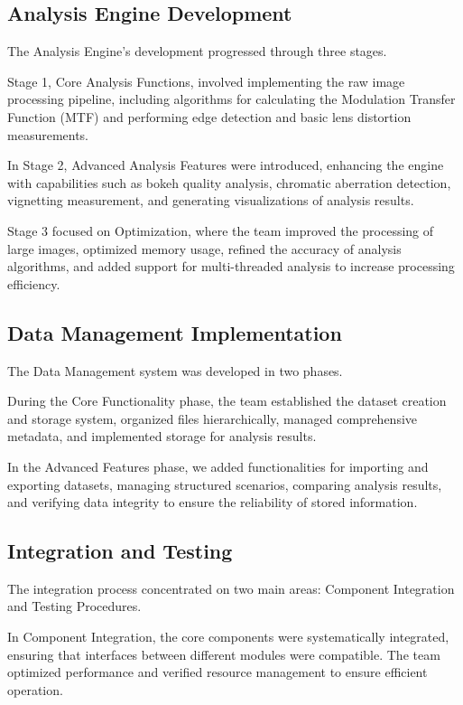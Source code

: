 \subsection{Analysis Engine Development}

The Analysis Engine's development progressed through three stages.

Stage 1, Core Analysis Functions, involved implementing the raw image processing pipeline, including algorithms for calculating the Modulation Transfer Function (MTF) and performing edge detection and basic lens distortion measurements.

In Stage 2, Advanced Analysis Features were introduced, enhancing the engine with capabilities such as bokeh quality analysis, chromatic aberration detection, vignetting measurement, and generating visualizations of analysis results.

Stage 3 focused on Optimization, where the team improved the processing of large images, optimized memory usage, refined the accuracy of analysis algorithms, and added support for multi-threaded analysis to increase processing efficiency.

\subsection{Data Management Implementation}

The Data Management system was developed in two phases.

During the Core Functionality phase, the team established the dataset creation and storage system, organized files hierarchically, managed comprehensive metadata, and implemented storage for analysis results.

In the Advanced Features phase, we added functionalities for importing and exporting datasets, managing structured scenarios, comparing analysis results, and verifying data integrity to ensure the reliability of stored information.

\subsection{Integration and Testing}

The integration process concentrated on two main areas: Component Integration and Testing Procedures.

In Component Integration, the core components were systematically integrated, ensuring that interfaces between different modules were compatible. The team optimized performance and verified resource management to ensure efficient operation.

